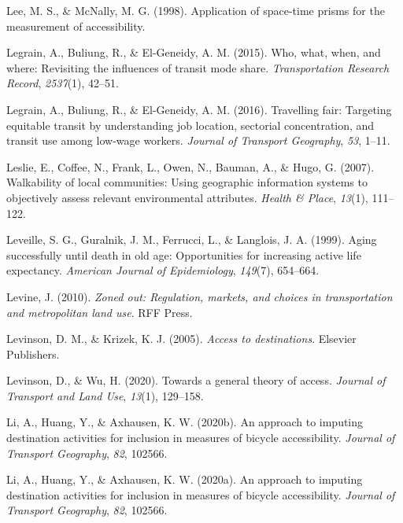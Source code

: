 \documentclass[
11pt, %
oneside, %
english, %
singlespacing, %
]{macthesis} %
\newlength{\cslhangindent}
\newenvironment{CSLReferences}[2] %
 {%
  \setlength{\parindent}{0pt}
  \ifodd #1 \everypar{\setlength{\hangindent}{\cslhangindent}}\ignorespaces\fi
  \ifnum #2 > 0
  \setlength{\parskip}{#2\baselineskip}
  \fi
 }%
 {}
\begin{document}
\begin{CSLReferences}{1}{0}
\leavevmode{}%
Lee, M. S., \& McNally, M. G. (1998). Application of space-time prisms for the measurement of accessibility.

\leavevmode{}%
Legrain, A., Buliung, R., \& El-Geneidy, A. M. (2015). Who, what, when, and where: Revisiting the influences of transit mode share. \emph{Transportation Research Record}, \emph{2537}(1), 42--51.

\leavevmode{}%
Legrain, A., Buliung, R., \& El-Geneidy, A. M. (2016). Travelling fair: Targeting equitable transit by understanding job location, sectorial concentration, and transit use among low-wage workers. \emph{Journal of Transport Geography}, \emph{53}, 1--11.

\leavevmode{}%
Leslie, E., Coffee, N., Frank, L., Owen, N., Bauman, A., \& Hugo, G. (2007). Walkability of local communities: Using geographic information systems to objectively assess relevant environmental attributes. \emph{Health \& Place}, \emph{13}(1), 111--122.

\leavevmode{}%
Leveille, S. G., Guralnik, J. M., Ferrucci, L., \& Langlois, J. A. (1999). Aging successfully until death in old age: Opportunities for increasing active life expectancy. \emph{American Journal of Epidemiology}, \emph{149}(7), 654--664.

\leavevmode{}%
Levine, J. (2010). \emph{Zoned out: Regulation, markets, and choices in transportation and metropolitan land use}. RFF Press.

\leavevmode{}%
Levinson, D. M., \& Krizek, K. J. (2005). \emph{Access to destinations}. Elsevier Publishers.

\leavevmode{}%
Levinson, D., \& Wu, H. (2020). Towards a general theory of access. \emph{Journal of Transport and Land Use}, \emph{13}(1), 129--158.

\leavevmode{}%
Li, A., Huang, Y., \& Axhausen, K. W. (2020b). An approach to imputing destination activities for inclusion in measures of bicycle accessibility. \emph{Journal of Transport Geography}, \emph{82}, 102566.

\leavevmode{}%
Li, A., Huang, Y., \& Axhausen, K. W. (2020a). An approach to imputing destination activities for inclusion in measures of bicycle accessibility. \emph{Journal of Transport Geography}, \emph{82}, 102566.


\end{CSLReferences}
\end{document}
